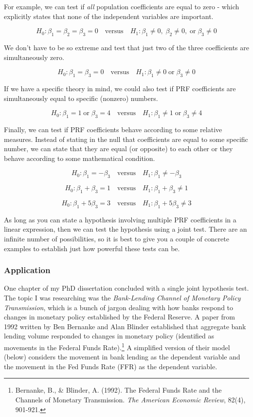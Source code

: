 \documentclass[
]{book}
\begin{document}
For example, we can test if \emph{all} population coefficients are equal to zero - which explicitly states that none of the independent variables are important.

\[H_0: \beta_1 = \beta_2 = \beta_3 = 0 \quad \text{versus} \quad H_1: \beta_1 \neq 0,\; \beta_2 \neq 0,\; \text{or} \; \beta_3 \neq 0\]

We don't have to be so extreme and test that just two of the three coefficients are simultaneously zero.

\[H_0: \beta_1 = \beta_3 = 0 \quad \text{versus} \quad H_1: \beta_1 \neq 0\; \text{or} \; \beta_3 \neq 0\]

If we have a specific theory in mind, we could also test if PRF coefficients are simultaneously equal to specific (nonzero) numbers.

\[H_0: \beta_1 = 1 \; \text{or} \; \beta_3 = 4 \quad \text{versus} \quad H_1: \beta_1 \neq 1\; \text{or} \; \beta_3 \neq 4\]

Finally, we can test if PRF coefficients behave according to some relative measures. Instead of stating in the null that coefficients are equal to some specific number, we can state that they are equal (or opposite) to each other or they behave according to some mathematical condition.

\[H_0: \beta_1 = -\beta_3 \quad \text{versus} \quad H_1: \beta_1 \neq -\beta_3\]

\[H_0: \beta_1 + \beta_3 = 1 \quad \text{versus} \quad H_1: \beta_1 + \beta_3 \neq 1\]

\[H_0: \beta_1 + 5\beta_3 = 3 \quad \text{versus} \quad H_1: \beta_1 + 5\beta_3 \neq 3\]

As long as you can state a hypothesis involving multiple PRF coefficients in a linear expression, then we can test the hypothesis using a joint test. There are an infinite number of possibilities, so it is best to give you a couple of concrete examples to establish just how powerful these tests can be.

\hypertarget{application}{%
\subsubsection*{Application}\label{application}}

One chapter of my PhD dissertation concluded with a single joint hypothesis test. The topic I was researching was the \emph{Bank-Lending Channel of Monetary Policy Transmission}, which is a bunch of jargon dealing with how banks respond to changes in monetary policy established by the Federal Reserve. A paper from 1992 written by Ben Bernanke and Alan Blinder established that aggregate bank lending volume responded to changes in monetary policy (identified as movements in the Federal Funds Rate).\footnote{Bernanke, B., \& Blinder, A. (1992). The Federal Funds Rate and the Channels of Monetary Transmission. \emph{The American Economic Review}, 82(4), 901-921.} A simplified version of their model (below) considers the movement in bank lending as the dependent variable and the movement in the Fed Funds Rate (FFR) as the dependent variable.
\end{document}
